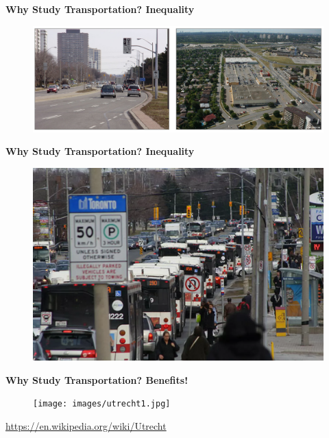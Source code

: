 \documentclass[aspectratio=169]{beamer}
\begin{document}
\begin{frame}
	\textbf{Why Study Transportation? Inequality}
	\begin{figure}
		\centering
		\includegraphics[width=1\linewidth]{images/suburbs_tor.png}
	\end{figure}
\end{frame}


\begin{frame}
	\textbf{Why Study Transportation? Inequality}
	\begin{figure}
		\centering
		\includegraphics[width=0.8\linewidth]{images/ttc_traffic.png}
	\end{figure}
\end{frame}



\begin{frame}
	\textbf{Why Study Transportation? Benefits!}
	\begin{figure}
		\centering
		\texttt{[image: images/utrecht1.jpg]}
	\end{figure}
	\tiny\url{https://en.wikipedia.org/wiki/Utrecht}
\end{frame}

\end{document}
